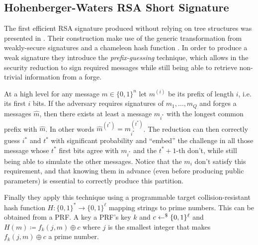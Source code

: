 
\subsection{Hohenberger-Waters RSA Short Signature}
The first efficient RSA signature produced without relying on tree structures was presented in \cite{C:HohWat09}. Their construction make use of the generic transformation from weakly-secure signatures and a chameleon hash function .
In order to produce a weak signature they introduce the \textit{prefix-guessing} technique, which allows in the security reduction to sign required messages while still being able to retrieve non-trivial information from a forge.

At a high level for any message $m \in \{0, 1\}^n$ let $m^{(i)}$ be its prefix of length $i$, i.e. its first $i$ bits. 
If the adversary requires signatures of $m_1, \ldots, m_Q$ and forges a messages $\hat{m}$, then there exists at least a message $m_{i^\ast}$ with the longest common prefix with $\hat{m}$.
In other words $\hat{m}^{(t^\ast)} = m_{i^\ast}^{(t^\ast)}$.
The reduction can then correctly guess $i^\ast$ and $t^\ast$ with significant probability and ``embed'' the challenge in all those message whose $t^\ast$ first bits agree with $m_{i^\ast}$ and the $t^\ast + 1$-th don't, while still being able to simulate the other messages.
Notice that the $m_i$ don't satisfy this requirement, and that knowing them in advance (even before producing public parameters) is essential to correctly produce this partition.

Finally they apply this technique using a programmable target collision-resistant hash function $H : \{0, 1\}^\ast \to \{0, 1\}^\ell$ mapping strings to prime numbers.
This can be obtained from a PRF. 
A key a PRF's key $k$ and $c \gets^{\$} \{0, 1\}^\ell$ and $H(m) \coloneqq f_k(j, m) \oplus c$ where $j$ is the smallest integer that makes $f_k(j, m) \oplus c$ a prime number.

